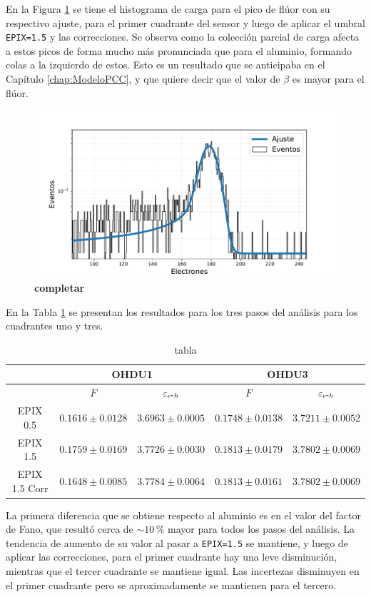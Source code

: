 En la Figura \ref{fig:F_OHDU0_EPIX15conCorr} se tiene el histograma de carga para el pico de flúor con su respectivo ajuste, para el primer cuadrante del sensor y luego de aplicar el umbral \verb|EPIX=1.5| y las correcciones. Se observa como la colección parcial de carga afecta a estos picos de forma mucho más pronunciada que para el aluminio, formando colas a la izquierdo de estos. Esto es un resultado que se anticipaba en el Capítulo \ref{chap:ModeloPCC}, y que quiere decir que el valor de $\beta$ es mayor para el flúor.
\begin{figure}[h]
    \centering
    \includegraphics[scale=0.5]{Figs/HistFit_F_EPIX15_OHDU1_Corr.pdf}
    \caption{\footnotesize{\textbf{completar}}}
    \label{fig:F_OHDU0_EPIX15conCorr}
\end{figure}
En la Tabla \ref{tab:F_FanoEehOHDU1y3} se presentan los resultados para los tres pasos del análisis para los cuadrantes uno y tres.
\begin{table}[h]
\centering
\begin{tabular}{@{}ccccc@{}}
\toprule
                & \multicolumn{2}{c}{OHDU1}                 & \multicolumn{2}{c}{OHDU3}                 \\ \hline\hline
                & $F$                 & $\varepsilon_{e\mbox{-}h}$ & $F$                 & $\varepsilon_{e\mbox{-}h}$ \\
EPIX 0.5 & $0.1616 \pm 0.0128$ & $3.6963 \pm 0.0005$ & $0.1748 \pm 0.0138$ & $3.7211 \pm 0.0052$ \\ 
EPIX 1.5 & $0.1759 \pm 0.0169$ & $3.7726 \pm 0.0030$ & $0.1813 \pm 0.0179$ & $3.7802 \pm 0.0069$ \\ 
EPIX 1.5 Corr & $0.1648 \pm 0.0085$ & $3.7784 \pm 0.0064$ & $0.1813 \pm 0.0161$ & $3.7802 \pm 0.0069$ \\ \bottomrule \hline
\end{tabular}
\caption{tabla}
\label{tab:F_FanoEehOHDU1y3}
\end{table}
La primera diferencia que se obtiene respecto al aluminio es en el valor del factor de Fano, que resultó cerca de $\sim 10\,\%$ mayor para todos los pasos del análisis. La tendencia de aumento de su valor al pasar a \verb|EPIX=1.5| se mantiene, y luego de aplicar las correcciones, para el primer cuadrante hay una leve disminución, mientras que el tercer cuadrante se mantiene igual. Las incertezas disminuyen en el primer cuadrante pero se aproximadamente se mantienen para el tercero. 

